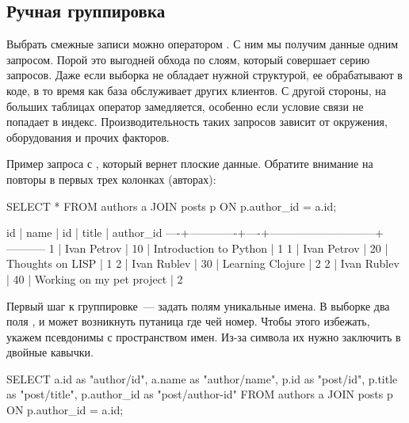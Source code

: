 \subsection{Ручная группировка}

Выбрать смежные записи можно оператором . С ним мы получим данные одним запросом. Порой это выгодней обхода по слоям, который совершает серию запросов. Даже если выборка не обладает нужной структурой, ее обрабатывают в коде, в то время как база обслуживает других клиентов. С другой стороны, на больших таблицах оператор  замедляется, особенно если условие связи не попадает в индекс. Производительность таких запросов зависит от окружения, оборудования и прочих факторов.

Пример запроса с , который вернет плоские данные. Обратите внимание на повторы в первых трех колонках (авторах):

\begin{english}
  \begin{sql}
SELECT *
FROM authors a
JOIN posts p ON p.author_id = a.id;
  \end{sql}
\end{english}

\begin{english}
  \begin{text}
 id |    name     | id |            title            | author_id
----+-------------+----+-----------------------------+-----------
  1 | Ivan Petrov | 10 | Introduction to Python      |         1
  1 | Ivan Petrov | 20 | Thoughts on LISP            |         1
  2 | Ivan Rublev | 30 | Learning Clojure            |         2
  2 | Ivan Rublev | 40 | Working on my pet project   |         2
  \end{text}
\end{english}

Первый шаг к группировке~--- задать полям уникальные имена. В выборке два поля , и может возникнуть путаница где чей номер. Чтобы этого избежать, укажем псевдонимы с пространством имен. Из-за символа \code{/} их нужно заключить в двойные кавычки.

\begin{english}
  \begin{sql}
SELECT
  a.id        as "author/id",
  a.name      as "author/name",
  p.id        as "post/id",
  p.title     as "post/title",
  p.author_id as "post/author-id"
FROM authors a
JOIN posts p ON p.author_id = a.id;
  \end{sql}
\end{english}

